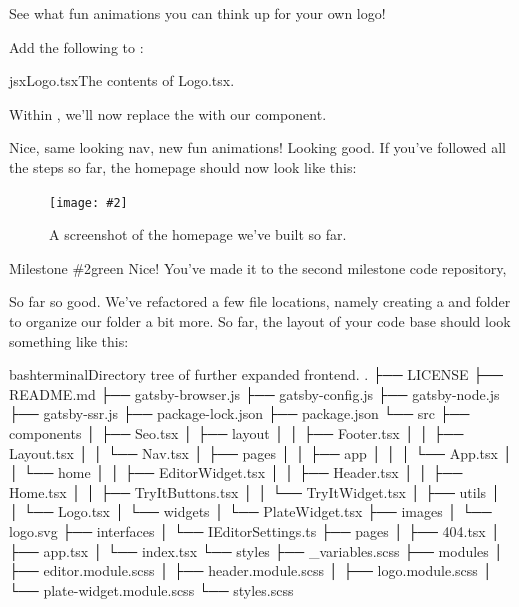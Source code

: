 \documentclass[paper=6in:9in,pagesize=pdftex,headinclude=on,footinclude=on,12pt]{scrbook}
\newcommand{\standardfigure}[3]{\begin{figure}[H]\begin{center}\texttt{[image: \#2]}\caption{#3}\label{fig:#2}\end{center}\end{figure}}
\begin{document}
See what fun animations you can think up for your own logo!

Add the following to :

\begin{codeInput}{jsx}{Logo.tsx}{The contents of Logo.tsx.}

\end{codeInput}

Within , we'll now replace the  with our  component.

Nice, same looking nav, new fun animations! Looking good. If you've followed all the steps so far, the homepage should now look like this:

\standardfigure{\textwidth}{frontend/homepage}{A screenshot of the homepage we've built so far.}


\begin{highlightBox}{Milestone \#2}{green}{\greenCheck}
Nice! You've made it to the second milestone code repository, 
\end{highlightBox}

So far so good. We've refactored a few file locations, namely creating a  and  folder to organize our  folder a bit more. So far, the layout of your code base should look something like this:

\begin{codeInput}{bash}{terminal}{Directory tree of further expanded frontend.}
.
├── LICENSE
├── README.md
├── gatsby-browser.js
├── gatsby-config.js
├── gatsby-node.js
├── gatsby-ssr.js
├── package-lock.json
├── package.json
└── src
    ├── components
    │   ├── Seo.tsx
    │   ├── layout
    │   │   ├── Footer.tsx
    │   │   ├── Layout.tsx
    │   │   └── Nav.tsx
    │   ├── pages
    │   │   ├── app
    │   │   │   └── App.tsx
    │   │   └── home
    │   │       ├── EditorWidget.tsx
    │   │       ├── Header.tsx
    │   │       ├── Home.tsx
    │   │       ├── TryItButtons.tsx
    │   │       └── TryItWidget.tsx
    │   ├── utils
    │   │   └── Logo.tsx
    │   └── widgets
    │       └── PlateWidget.tsx
    ├── images
    │   └── logo.svg
    ├── interfaces
    │   └── IEditorSettings.ts
    ├── pages
    │   ├── 404.tsx
    │   ├── app.tsx
    │   └── index.tsx
    └── styles
        ├── _variables.scss
        ├── modules
        │   ├── editor.module.scss
        │   ├── header.module.scss
        │   ├── logo.module.scss
        │   └── plate-widget.module.scss
        └── styles.scss
\end{codeInput}
\end{document}
